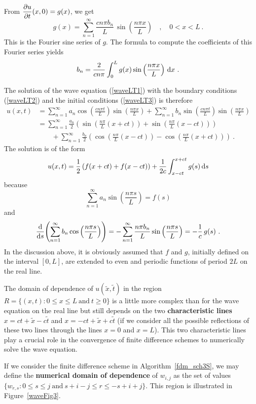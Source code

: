 From $\displaystyle \pdydx{u}{t}(x,0) = g(x)$, we get
\[
g(x) = \sum_{n=1}^\infty \frac{cn\pi b_n}{L}\,
\sin\left(\frac{n\pi x}{L}\right)
\quad , \quad 0<x<L \ .
\]
This is the Fourier sine series of $g$.  The formula to compute the
coefficients of this Fourier series yields
\[
b_n = \frac{2}{cn\pi} \int_0^L g(x)
\sin\left(\frac{n\pi x}{L}\right) \dx{x} \ .
\]

The solution of the wave equation (\ref{waveLT1}) with the boundary
conditions (\ref{waveLT2}) and the initial conditions (\ref{waveLT3})
is therefore
\begin{align*}
u(x,t) &= \sum_{n=1}^\infty a_n \cos\left(\frac{cn\pi t}{L}\right)
\sin\left(\frac{n\pi x}{L}\right)
+ \sum_{n=1}^\infty b_n \sin\left(\frac{cn\pi t}{L}\right)
\sin\left(\frac{n\pi x}{L}\right) \\
&= \sum_{n=1}^\infty \frac{a_n}{2}
\left( \sin\left(\frac{n\pi}{L}(x+ct)\right)
+ \sin\left(\frac{n\pi}{L}(x-ct)\right)\right) \\
&\qquad + \sum_{n=1}^\infty \frac{b_n}{2}
\left( \cos\left(\frac{n\pi}{L}(x-ct)\right)
- \cos\left(\frac{n\pi}{L}(x+ct)\right)\right) \ .
\end{align*}
The solution is of the form
\[
u(x,t) = \frac{1}{2} \left( f(x+ct) + f(x-ct) \right)
+ \frac{1}{2c} \int_{x-ct}^{x+ct} g(s) \dx{s}
\]
because
\[
\sum_{n=1}^\infty a_n \sin\left(\frac{n\pi s}{L}\right) = f(s)
\]
and
\[
\dfdx{\left( \sum_{n=1}^\infty b_n \cos\left(\frac{n\pi s}{L}\right)\right)}{s}
= -\sum_{n=1}^\infty \frac{n\pi b_n}{L} \sin\left(\frac{n\pi s}{L}\right)
= -\frac{1}{c}\, g(s) \ .
\]
In the discussion above, it is obviously assumed that $f$ and $g$,
initially defined on the interval $[0,L]$, are extended to
even and periodic functions of period $2L$ on the real line.

The domain of dependence of $u(\tilde{x},\tilde{t})$ in the region
$R = \{ (x,t) : 0\leq x \leq L \ \text{and}\  t \geq 0 \}$ is a little
more complex than for the wave equation on the real line but still
depends on the two
{\bfseries characteristic lines}
$x = ct + \tilde{x} - c \tilde{t}$ and
$x = - ct + \tilde{x} + c \tilde{t}$ (if we consider all the possible
reflections of these two lines through the lines $x=0$ and $x= L$).
This two characteristic lines play a crucial role in the convergence
of finite difference schemes to numerically solve the wave equation.

If we consider the finite difference scheme in
Algorithm~\ref{fdm_sch3S}, we may define the
{\bfseries numerical domain of dependence} of $w_{i,j}$ as the set of values
$\{ w_{r,s} : 0 \leq s \leq j \ \text{and} \ s + i - j \leq r \leq -s
+ i + j \}$.  This region is illustrated in Figure~\ref{waveFig3}.

